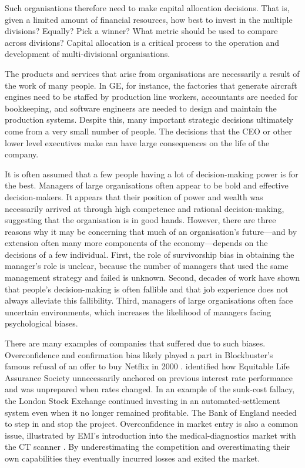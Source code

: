 \documentclass[a4paper, nobind, dvipsnames]{templates/ociamthesis}
\theoremstyle{definition}
\theoremstyle{definition}
\theoremstyle{definition}
\theoremstyle{definition}
\theoremstyle{remark}
\begin{document}
Such organisations therefore need to make capital allocation decisions. That is,
given a limited amount of financial resources, how best to invest in the
multiple divisions? Equally? Pick a winner? What metric should be used to
compare across divisions? Capital allocation is a critical process to the
operation and development of multi-divisional organisations.

The products and services that arise from organisations are necessarily a result
of the work of many people. In GE, for instance, the factories that generate
aircraft engines need to be staffed by production line workers, accountants are
needed for bookkeeping, and software engineers are needed to design and maintain
the production systems. Despite this, many important strategic decisions
ultimately come from a very small number of people. The decisions that the CEO
or other lower level executives make can have large consequences on the life of
the company.

It is often assumed that a few people having a lot of decision-making power is
for the best. Managers of large organisations often appear to be bold and
effective decision-makers. It appears that their position of power and wealth
was necessarily arrived at through high competence and rational decision-making,
suggesting that the organisation is in good hands. However, there are three
reasons why it may be concerning that much of an organisation's future---and by
extension often many more components of the economy---depends on the decisions
of a few individual. First, the role of survivorship bias in obtaining the
manager's role is unclear, because the number of managers that used the same
management strategy and failed is unknown. Second, decades of work have shown
that people's decision-making is often fallible and that job experience does not
always alleviate this fallibility. Third, managers of large organisations often
face uncertain environments, which increases the likelihood of managers facing
psychological biases.

There are many examples of companies that suffered due to such biases.
Overconfidence and confirmation bias likely played a part in Blockbuster's
famous refusal of an offer to buy Netflix in 2000 \autocite{meissner2015}. \textcite{roxburgh2003}
identified how Equitable Life Assurance Society unnecessarily anchored on
previous interest rate performance and was unprepared when rates changed. In an
example of the sunk-cost fallacy, the London Stock Exchange continued investing
in an automated-settlement system even when it no longer remained profitable.
The Bank of England needed to step in and stop the project. Overconfidence in
market entry is also a common issue, illustrated by EMI's introduction into the
medical-diagnostics market with the CT scanner \autocite{horn2005,camerer1999}. By
underestimating the competition and overestimating their own capabilities they
eventually incurred losses and exited the market.
\end{document}

